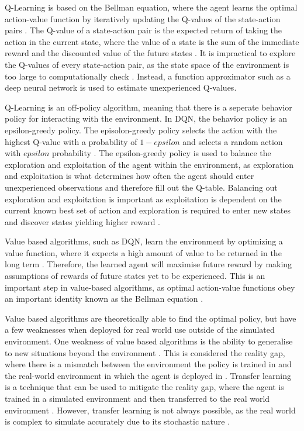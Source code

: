 Q-Learning is based on the Bellman equation, where the agent learns the optimal action-value function by iteratively updating the Q-values of the state-action pairs \cite{mnih2013playing}. The Q-value of a state-action pair is the expected return of taking the action in the current state, where the value of a state is the sum of the immediate reward and the discounted value of the future states \cite{bellman1958dynamic}. It is impractical to explore the Q-values of every state-action pair, as the state space of the environment is too large to computationally check \cite{mnih2013playing}. Instead, a function approximator such as a deep neural network is used to estimate unexperienced Q-values. 

Q-Learning is an off-policy algorithm, meaning that there is a seperate behavior policy for interacting with the environment. In DQN, the behavior policy is an epsilon-greedy policy. The episolon-greedy policy selects the action with the highest Q-value with a probability of $1 - epsilon$ and selects a random action with $epsilon$ probability \cite{TFAgentsAuthors2023}. The epsilon-greedy policy is used to balance the exploration and exploitation of the agent within the environment, as exploration and exploitation is what determines how often the agent should enter unexperienced observations and therefore fill out the Q-table. Balancing out exploration and exploitation is important as exploitation is dependent on the current known best set of action and exploration is required to enter new states and discover states yielding higher reward \cite{TFAgentsAuthors2023}.

Value based algorithms, such as DQN, learn the environment by optimizing a value function, where it expects a high amount of value to be returned in the long term \cite{deepcheckRL}. Therefore, the learned agent will maximise future reward by making assumptions of rewards of future states yet to be experienced. This is an important step in value-based algorithms, as optimal action-value functions obey an important identity known as the Bellman equation \cite{mnih2013playing}. 

Value based algorithms are theoretically able to find the optimal policy, but have a few weaknesses when deployed for real world use outside of the simulated environment. One weakness of value based algorithms is the ability to generalise to new situations beyond the environment \cite{OdelTruxillo2023}. This is considered the reality gap, where there is a mismatch between the environment the policy is trained in and the real-world environment in which the agent is deployed in \cite{tobin2017domain}. Transfer learning is a technique that can be used to mitigate the reality gap, where the agent is trained in a simulated environment and then transferred to the real world environment \cite{OdelTruxillo2023}. However, transfer learning is not always possible, as the real world is complex to simulate accurately due to its stochastic nature \cite{OdelTruxillo2023}. 

